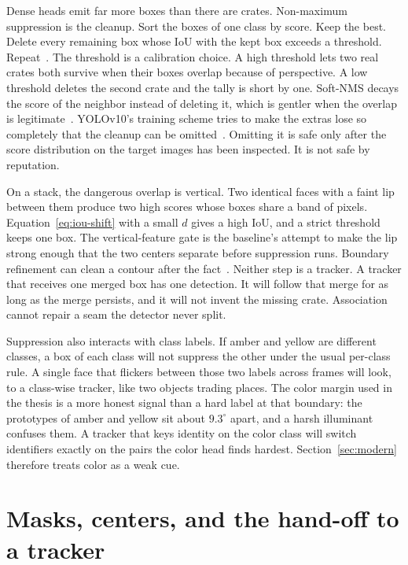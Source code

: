 \documentclass[11pt,a4paper]{article}
\begin{document}
Dense heads emit far more boxes than there are crates. Non-maximum suppression is the cleanup. Sort the boxes of one class by score. Keep the best. Delete every remaining box whose IoU with the kept box exceeds a threshold. Repeat~\cite{girshick2015fast}. The threshold is a calibration choice. A high threshold lets two real crates both survive when their boxes overlap because of perspective. A low threshold deletes the second crate and the tally is short by one. Soft-NMS decays the score of the neighbor instead of deleting it, which is gentler when the overlap is legitimate~\cite{bodla2017softnms}. YOLOv10's training scheme tries to make the extras lose so completely that the cleanup can be omitted~\cite{wang2024yolov10}. Omitting it is safe only after the score distribution on the target images has been inspected. It is not safe by reputation.

On a stack, the dangerous overlap is vertical. Two identical faces with a faint lip between them produce two high scores whose boxes share a band of pixels. Equation~\eqref{eq:iou-shift} with a small $d$ gives a high IoU, and a strict threshold keeps one box. The vertical-feature gate is the baseline's attempt to make the lip strong enough that the two centers separate before suppression runs. Boundary refinement can clean a contour after the fact~\cite{kirillov2020pointrend}. Neither step is a tracker. A tracker that receives one merged box has one detection. It will follow that merge for as long as the merge persists, and it will not invent the missing crate. Association cannot repair a seam the detector never split.

Suppression also interacts with class labels. If amber and yellow are different classes, a box of each class will not suppress the other under the usual per-class rule. A single face that flickers between those two labels across frames will look, to a class-wise tracker, like two objects trading places. The color margin used in the thesis is a more honest signal than a hard label at that boundary: the prototypes of amber and yellow sit about $9.3^{\circ}$ apart, and a harsh illuminant confuses them. A tracker that keys identity on the color class will switch identifiers exactly on the pairs the color head finds hardest. Section~\ref{sec:modern} therefore treats color as a weak cue.

\section{Masks, centers, and the hand-off to a tracker}
\label{sec:mask}
\end{document}
